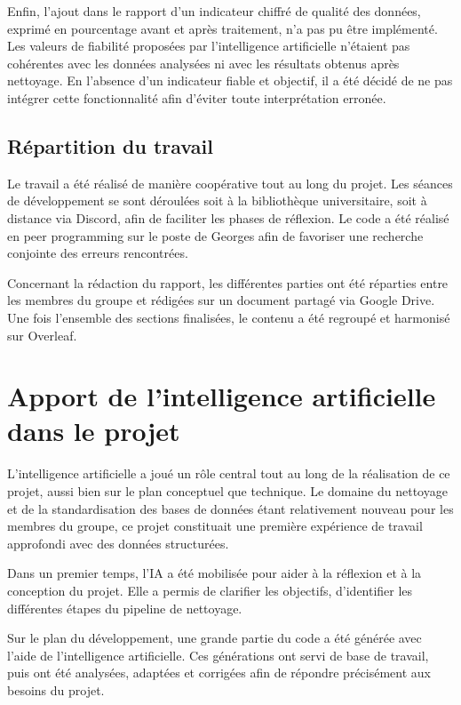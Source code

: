 \documentclass[a4paper, 12pt, twoside]{article}
\begin{document}
Enfin, l’ajout dans le rapport d’un indicateur chiffré de qualité des données, exprimé en pourcentage avant et après traitement, n’a pas pu être implémenté. Les valeurs de fiabilité proposées par l’intelligence artificielle n’étaient pas cohérentes avec les données analysées ni avec les résultats obtenus après nettoyage. En l’absence d’un indicateur fiable et objectif, il a été décidé de ne pas intégrer cette fonctionnalité afin d’éviter toute interprétation erronée.

\subsection*{Répartition du travail}

Le travail a été réalisé de manière coopérative tout au long du projet. Les séances de développement se sont déroulées soit à la bibliothèque universitaire, soit à distance via Discord, afin de faciliter les phases de réflexion. Le code a été réalisé en peer programming sur le poste de Georges afin de favoriser une recherche conjointe des erreurs rencontrées.

Concernant la rédaction du rapport, les différentes parties ont été réparties entre les membres du groupe et rédigées sur un document partagé via Google Drive. Une fois l’ensemble des sections finalisées, le contenu a été regroupé et harmonisé sur Overleaf.

\newpage
\section{Apport de l’intelligence artificielle dans le projet}

L’intelligence artificielle a joué un rôle central tout au long de la réalisation de ce projet, aussi bien sur le plan conceptuel que technique. Le domaine du nettoyage et de la standardisation des bases de données étant relativement nouveau pour les membres du groupe, ce projet constituait une première expérience de travail approfondi avec des données structurées.

Dans un premier temps, l’IA a été mobilisée pour aider à la réflexion et à la conception du projet. Elle a permis de clarifier les objectifs, d’identifier les différentes étapes du pipeline de nettoyage.

Sur le plan du développement, une grande partie du code a été générée avec l’aide de l’intelligence artificielle. Ces générations ont servi de base de travail, puis ont été analysées, adaptées et corrigées afin de répondre précisément aux besoins du projet.
\end{document}
